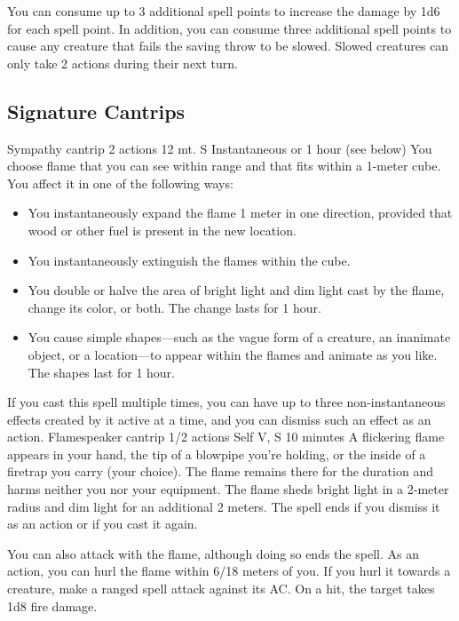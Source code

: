             You can consume up to 3 additional spell points to increase the damage by 1d6 for each spell point.
            In addition, you can consume three additional spell points to cause any creature that fails the saving throw to be slowed.
            Slowed creatures can only take 2 actions during their next turn.

\subsection*{Signature Cantrips}
        {Sympathy cantrip}
        {2 actions}
        {12 mt.}
        {S}
        {Instantaneous or 1 hour (see below)}
        You choose flame that you can see within range and that fits within a 1-meter cube.
        You affect it in one of the following ways:
        \begin{itemize}
            \item You instantaneously expand the flame 1 meter in one direction, provided that wood or other fuel is present in the new location.
            \item You instantaneously extinguish the flames within the cube.
            \item You double or halve the area of bright light and dim light cast by the flame, change its color, or both.
            The change lasts for 1 hour.
            \item You cause simple shapes---such as the vague form of a creature, an inanimate object, or a location---to appear within the flames and animate as you like.
            The shapes last for 1 hour.
        \end{itemize}
        If you cast this spell multiple times, you can have up to three non-instantaneous effects created by it active at a time, and you can dismiss such an effect as an action.
        {Flamespeaker cantrip}
        {1/2 actions}
        {Self}
        {V, S}
        {10 minutes}
        A flickering flame appears in your hand, the tip of a blowpipe you're holding, or the inside of a firetrap you carry (your choice).
        The flame remains there for the duration and harms neither you nor your equipment.
        The flame sheds bright light in a 2-meter radius and dim light for an additional 2 meters.
        The spell ends if you dismiss it as an action or if you cast it again.

        You can also attack with the flame, although doing so ends the spell.
        As an action, you can hurl the flame within 6/18 meters of you.
        If you hurl it towards a creature, make a ranged spell attack against its AC.
        On a hit, the target takes 1d8 fire damage.

